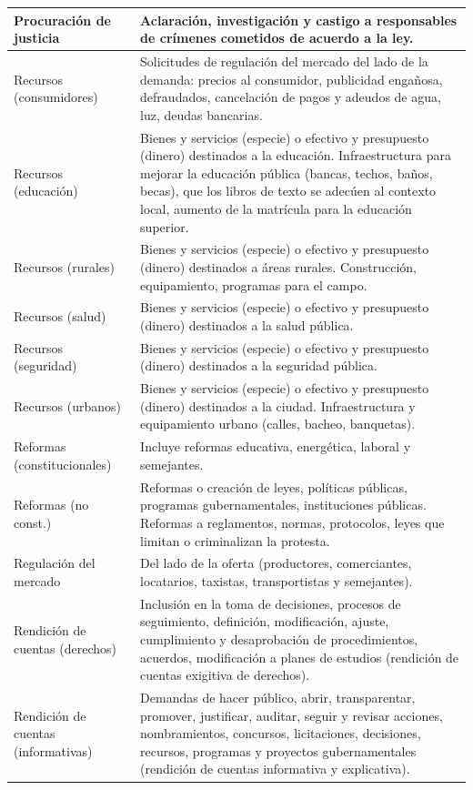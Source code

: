 \documentclass[letterpaper, 11pt]{book}
\theoremstyle{definition}
\theoremstyle{remark}
\begin{document}
{{{{{{{{{{\begin{footnotesize}
\begin{longtable}{|p{4cm}@{ }|p{11cm}@{ }|}
Procuración de justicia & Aclaración, investigación y castigo a responsables de crímenes cometidos de acuerdo a la ley.\\
\hline
Recursos (consumidores) & Solicitudes de regulación del mercado del lado de la demanda: precios al consumidor, publicidad engañosa, defraudados, cancelación de pagos y adeudos de agua, luz, deudas bancarias.\\
\hline
Recursos (educación) & Bienes y servicios (especie) o efectivo y presupuesto (dinero) destinados a la educación. Infraestructura para mejorar la educación pública (bancas, techos, baños, becas), que los libros de texto se adecúen al contexto local, aumento de la matrícula para la educación superior.\\
\hline
Recursos (rurales) &  Bienes y servicios (especie) o efectivo y presupuesto (dinero) destinados a áreas rurales. Construcción, equipamiento, programas para el campo.\\
\hline
Recursos (salud) &  Bienes y servicios (especie) o efectivo y presupuesto (dinero) destinados a la salud pública.\\
\hline
Recursos (seguridad) & Bienes y servicios (especie) o efectivo y presupuesto (dinero) destinados a la seguridad pública.\\
\hline
Recursos (urbanos) &  Bienes y servicios (especie) o efectivo y presupuesto (dinero) destinados a la ciudad. Infraestructura y equipamiento urbano (calles, bacheo, banquetas).\\
\hline
Reformas (constitucionales) & Incluye reformas educativa, energética, laboral y semejantes.\\
\hline
Reformas (no const.) & Reformas o creación de leyes, políticas públicas, programas gubernamentales, instituciones públicas. Reformas a reglamentos, normas, protocolos, leyes que limitan o criminalizan la protesta.\\
\hline
Regulación del mercado &  Del lado de la oferta (productores, comerciantes, locatarios, taxistas, transportistas y semejantes).\\
\hline
Rendición de cuentas (derechos) & Inclusión en la toma de decisiones, procesos de seguimiento, definición, modificación, ajuste, cumplimiento y desaprobación de procedimientos, acuerdos, modificación a planes de estudios (rendición de cuentas exigitiva de derechos).\\
\hline
Rendición de cuentas (informativas) & Demandas de hacer público, abrir, transparentar, promover, justificar, auditar, seguir y revisar acciones, nombramientos, concursos, licitaciones, decisiones, recursos, programas y proyectos gubernamentales (rendición de cuentas informativa y explicativa).\\

\end{longtable}
\end{footnotesize}}}}}}}}}}}
\end{document}
